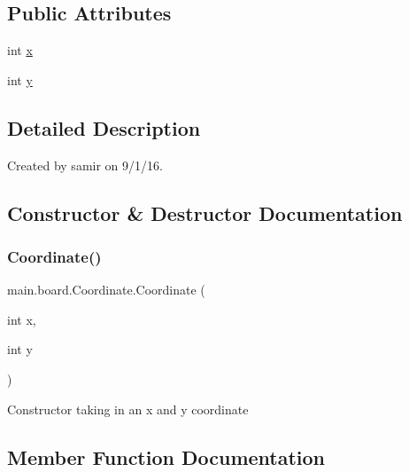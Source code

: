 \subsection*{Public Attributes}
\begin{DoxyCompactItemize}
\item 
int \hyperlink{classmain_1_1board_1_1_coordinate_ac701cbd77073d0d4a9150c818e48786c}{x}
\item 
int \hyperlink{classmain_1_1board_1_1_coordinate_a27d26b13fe0a54b6800a9a3e130b0445}{y}
\end{DoxyCompactItemize}


\subsection{Detailed Description}
Created by samir on 9/1/16. 

\subsection{Constructor \& Destructor Documentation}
\hypertarget{classmain_1_1board_1_1_coordinate_a355e7b83bfbbfa7b63643484f37042d2}{}\label{classmain_1_1board_1_1_coordinate_a355e7b83bfbbfa7b63643484f37042d2} 
\subsubsection{\texorpdfstring{Coordinate()}{Coordinate()}}
{\footnotesize\ttfamily main.\+board.\+Coordinate.\+Coordinate (\begin{DoxyParamCaption}\item[{int}]{x,  }\item[{int}]{y }\end{DoxyParamCaption})}

Constructor taking in an x and y coordinate 

\subsection{Member Function Documentation}
\hypertarget{classmain_1_1board_1_1_coordinate_a376cac714ac3dd5f6452c6678e12ad26}{}\label{classmain_1_1board_1_1_coordinate_a376cac714ac3dd5f6452c6678e12ad26} 
